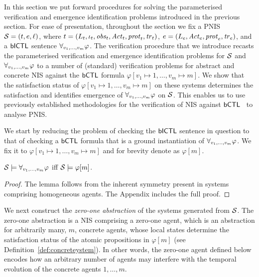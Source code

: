 In this section we put forward procedures for solving the parameterised
verification and emergence identification problems introduced in the previous
section. For ease of presentation, throughout the section we fix a PNIS
$\mathcal S = \left ( t, e, \ell \right )$, where
${t} = \left ( L_{t}, \iota_{t}, \mathit{obs}_{t}, \mathit{Act}_{t}, \mathit{prot}_{t}, \mathit{tr}_{t}  \right )$,
${e} = \left ( L_{e}, \mathit{Act}_{e}, \mathit{prot}_{e}, \mathit{tr}_{e}  \right )$, and a $\sf{bICTL}$ sentence
$\forall_{v_1,\ldots,v_m} \varphi$. The verification procedure that we introduce recasts the
parameterised verification and emergence identification problems for $\mathcal S$
and $\forall_{v_1,\ldots,v_m} \varphi$ to a number of (standard) verification problems for abstract
and concrete NIS against the $\sf{bCTL}$ formula
$\varphi[v_1 \mapsto 1, \ldots, v_m \mapsto m]$.  We show that the satisfaction
status of $\varphi[v_1 \mapsto 1, \ldots, v_m \mapsto m]$ on these systems
determines the satisfaction and identifies emergence of
$\forall_{v_1,\ldots,v_m} \varphi$ on $\mathcal S$. This enables us to use previously established
methodologies for the verification of NIS against $\sf{bCTL}$~\cite{Akintunde+20b}
to analyse PNIS.


We start by reducing the problem of checking the $\sf{bICTL}$ sentence in
question to that of checking a $\sf{bCTL}$ formula that is a ground
instantiation of $\forall_{v_1,\ldots,v_m} \varphi$.  We fix it to
$\varphi[v_1 \mapsto 1, \ldots, v_m \mapsto m]$ and for brevity denote
as $\varphi[m]$.


\begin{lemma}
\label{lemma:symmetry}
$\mathcal S \models \forall_{v_1,\ldots,v_m} \varphi$ iff $\mathcal S \models \varphi[m]$.
\end{lemma}
\begin{proof}
The lemma follows from the inherent symmetry present in systems comprising
homogeneous agents. The Appendix includes the full proof.
\end{proof}

We next construct the \emph{zero-one abstraction} of the systems generated from
$\mathcal S$. The zero-one abstraction is a NIS comprising a zero-one agent, which
is an abstraction for arbitrarily many, $m$, concrete agents, whose local
states determine the satisfaction status of the atomic propositions in
$\varphi[m]$ (see Definition~\ref{def:concreteystem}). %
In other words, the zero-one agent defined below encodes how an arbitrary
number of agents may interfere with the temporal evolution of the concrete
agents $1, \ldots, m$.

